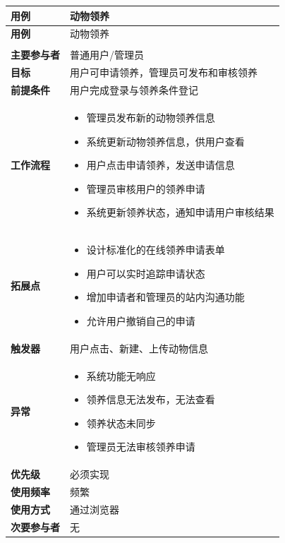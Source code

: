 \documentclass[12pt,a4paper,UTF8]{article}
\begin{document}
\begin{xltabular}{\linewidth}{|>{\raggedright\arraybackslash}p{3cm}|>{\raggedright\arraybackslash}p{8cm}|}
  \hline
  \textbf{用例} & 动物领养 \\ \hline \endfirsthead
  \hline
  \textbf{用例} & 动物领养 \\ \hline \endhead
  \hline
   \\ \endfoot
  \hline \endlastfoot

  \textbf{主要参与者} & 普通用户/管理员 \\ \hline
  \textbf{目标} & 用户可申请领养，管理员可发布和审核领养 \\ \hline
  \textbf{前提条件} & 用户完成登录与领养条件登记 \\ \hline
  \textbf{工作流程} & 
  \vspace{-0.5em}
  \begin{itemize}[topsep=0pt, partopsep=0pt, left=0pt, nosep]
      \item 管理员发布新的动物领养信息
      \item 系统更新动物领养信息，供用户查看
      \item 用户点击申请领养，发送申请信息
      \item 管理员审核用户的领养申请
      \item 系统更新领养状态，通知申请用户审核结果
  \end{itemize} \\ \hline
  \textbf{拓展点} &
  \vspace{-0.5em}
  \begin{itemize}[topsep=0pt, partopsep=0pt, left=0pt, nosep]
      \item 设计标准化的在线领养申请表单
      \item 用户可以实时追踪申请状态
      \item 增加申请者和管理员的站内沟通功能
      \item 允许用户撤销自己的申请
  \end{itemize} \\ \hline
  \textbf{触发器} & 用户点击、新建、上传动物信息 \\ \hline
  \textbf{异常} & 
  \vspace{-0.5em}
  \begin{itemize}[topsep=0pt, partopsep=0pt, left=0pt, nosep]
      \item 系统功能无响应
      \item 领养信息无法发布，无法查看
      \item 领养状态未同步
      \item 管理员无法审核领养申请
  \end{itemize} \\ \hline
  \textbf{优先级} & 必须实现 \\ \hline
  \textbf{使用频率} & 频繁 \\ \hline
  \textbf{使用方式} & 通过浏览器 \\ \hline
  \textbf{次要参与者} & 无 \\ \hline
\end{xltabular}
\end{document}
